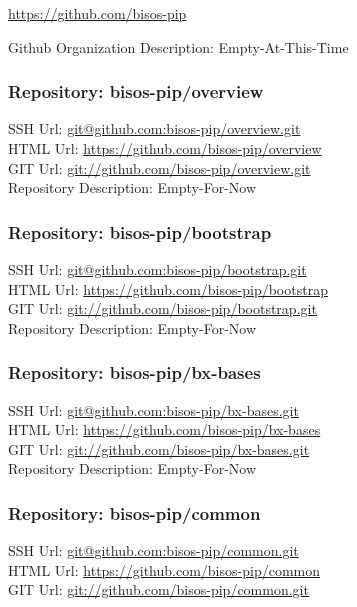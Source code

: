 \url{https://github.com/bisos-pip}

Github Organization Description: Empty-At-This-Time

\subsubsection{Repository: bisos-pip/overview}

SSH Url:  \url{git@github.com:bisos-pip/overview.git}\\
HTML Url: \url{https://github.com/bisos-pip/overview}\\
GIT Url:  \url{git://github.com/bisos-pip/overview.git}\\


Repository Description: Empty-For-Now

\subsubsection{Repository: bisos-pip/bootstrap}

SSH Url:  \url{git@github.com:bisos-pip/bootstrap.git}\\
HTML Url: \url{https://github.com/bisos-pip/bootstrap}\\
GIT Url:  \url{git://github.com/bisos-pip/bootstrap.git}\\


Repository Description: Empty-For-Now

\subsubsection{Repository: bisos-pip/bx-bases}

SSH Url:  \url{git@github.com:bisos-pip/bx-bases.git}\\
HTML Url: \url{https://github.com/bisos-pip/bx-bases}\\
GIT Url:  \url{git://github.com/bisos-pip/bx-bases.git}\\


Repository Description: Empty-For-Now

\subsubsection{Repository: bisos-pip/common}

SSH Url:  \url{git@github.com:bisos-pip/common.git}\\
HTML Url: \url{https://github.com/bisos-pip/common}\\
GIT Url:  \url{git://github.com/bisos-pip/common.git}\\


